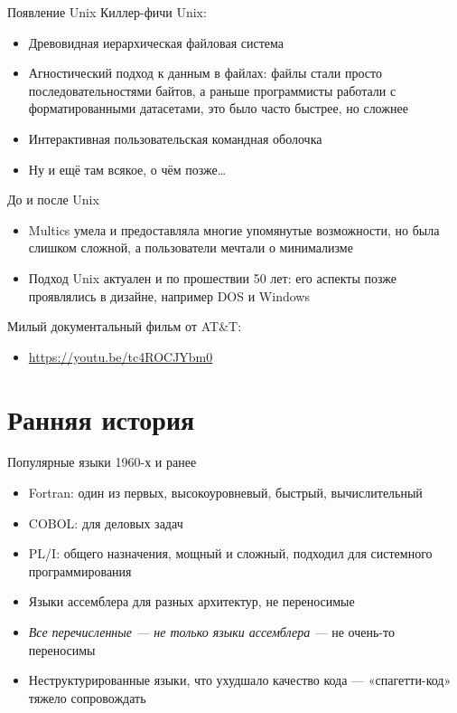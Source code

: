 \documentclass[xetex,aspectratio=169]{beamer}
\begin{document}
\begin{frame}{Появление Unix}
Киллер-фичи Unix:

\begin{itemize}
	\item Древовидная иерархическая файловая система
	\item Агностический подход к данным в файлах: файлы стали просто последовательностями байтов, а раньше программисты работали с форматированными датасетами, это было часто быстрее, но сложнее
	\item Интерактивная пользовательская командная оболочка
	\pause
	\item Ну и ещё там всякое, о чём позже\ldots
\end{itemize}

\end{frame}

\begin{frame}{До и после Unix}

\begin{itemize}
	\item Multics умела и предоставляла многие упомянутые возможности, но была слишком сложной, а пользователи мечтали о минимализме
	\item Подход Unix актуален и по прошествии 50 лет: его аспекты позже проявлялись в дизайне, например DOS и Windows
\end{itemize}

Милый документальный фильм от AT\&T:
\begin{itemize}
	\item \url{https://youtu.be/tc4ROCJYbm0}
\end{itemize}

\end{frame}

\section{Ранняя история}

\begin{frame}{Популярные языки 1960-х и ранее}
	\begin{itemize}
		\item Fortran: один из первых, высокоуровневый, быстрый, вычислительный
		\item COBOL: для деловых задач
		\item PL/I: общего назначения, мощный и сложный, подходил для системного программирования
		\item Языки ассемблера для разных архитектур, не переносимые
	\end{itemize}

\pause

	\begin{itemize}
		\item \emph{Все перечисленные --- не только языки ассемблера ---} не очень-то переносимы
		\item Неструктурированные языки, что ухудшало качество кода --- «спагетти-код» тяжело сопровождать
	\end{itemize}
\end{frame}
\end{document}
